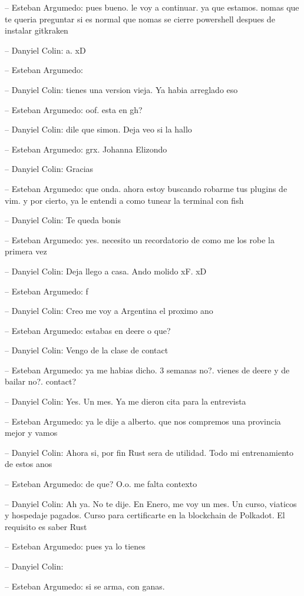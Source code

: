 -- Esteban Argumedo: pues bueno. le voy a continuar. ya que estamos.
nomas que te queria preguntar si es normal que nomas se cierre
powershell despues de instalar gitkraken

-- Danyiel Colin: a. xD

-- Esteban Argumedo:

-- Danyiel Colin: tienes una version vieja. Ya habia arreglado eso

-- Esteban Argumedo: oof. esta en gh?

-- Danyiel Colin: dile que simon. Deja veo si la hallo

-- Esteban Argumedo: grx. Johanna Elizondo

-- Danyiel Colin: Gracias

-- Esteban Argumedo: que onda. ahora estoy buscando robarme tus plugins
de vim. y por cierto, ya le entendi a como tunear la terminal con fish

-- Danyiel Colin: Te queda bonis

-- Esteban Argumedo: yes. necesito un recordatorio de como me los robe
la primera vez

-- Danyiel Colin: Deja llego a casa. Ando molido xF. xD

-- Esteban Argumedo: f

-- Danyiel Colin: Creo me voy a Argentina el proximo ano

-- Esteban Argumedo: estabas en deere o que?

-- Danyiel Colin: Vengo de la clase de contact

-- Esteban Argumedo: ya me habias dicho. 3 semanas no?. vienes de deere
y de bailar no?. contact?

-- Danyiel Colin: Yes. Un mes. Ya me dieron cita para la entrevista

-- Esteban Argumedo: ya le dije a alberto. que nos compremos una
provincia mejor y vamos

-- Danyiel Colin: Ahora si, por fin Rust sera de utilidad. Todo mi
entrenamiento de estos anos

-- Esteban Argumedo: de que? O.o. me falta contexto

-- Danyiel Colin: Ah ya. No te dije. En Enero, me voy un mes. Un curso,
viaticos y hospedaje pagados. Curso para certificarte en la blockchain
de Polkadot. El requisito es saber Rust

-- Esteban Argumedo: pues ya lo tienes

-- Danyiel Colin:

-- Esteban Argumedo: si se arma, con ganas.

